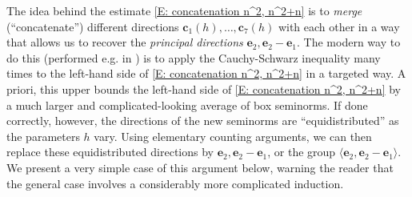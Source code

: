 \documentclass[11pt]{amsart}
\theoremstyle{definition}
\newcommand{\bc}{{\mathbf{c}}}
\newcommand{\be}{{\mathbf{e}}}
\newcommand{\1}{{\mathbf{1}}}
\begin{document}
The idea behind the estimate \eqref{E: concatenation n^2, n^2+n} is to \emph{merge} (``concatenate'') different directions $\bc_1(h), \ldots, \bc_7(h)$ with each other in a way that allows us to recover the \emph{principal directions} $\be_2, \be_2-\be_1$. The modern way to do this (performed e.g. in \cite{DKKST24, KKL24a, Kuc23}) is to apply the Cauchy-Schwarz inequality many times to the left-hand side of \eqref{E: concatenation n^2, n^2+n} in a targeted way. A priori, this upper bounds the left-hand side of \eqref{E: concatenation n^2, n^2+n} by a much larger and complicated-looking average of box seminorms. If done correctly, however, the directions of the new seminorms are ``equidistributed'' as the parameters $h$ vary. Using elementary counting arguments, we can then replace these equidistributed directions by $\be_2, \be_2-\be_1$, or the group $\langle \be_2, \be_2-\be_1\rangle$. We present a very simple case of this argument below, warning the reader that the general case involves a considerably more complicated induction.
\end{document}
